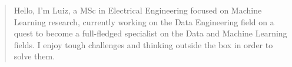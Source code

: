\documentclass[10pt,a4paper,ragged2e,withhyper]{altacv}
\begin{document}
\begin{paracol}{2}
        \newpage
        
        \switchcolumn
        
            \begin{quote}
                Hello, I'm Luiz, a MSc in Electrical Engineering focused on Machine Learning research, currently working 
                on the Data Engineering field on a quest to become a full-fledged specialist on the Data and Machine Learning fields. I enjoy tough challenges and thinking outside the box in order to solve them. 
                
            \end{quote}
        
        

\end{paracol}
\end{document}
